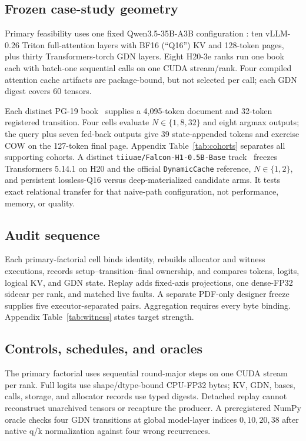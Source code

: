 \documentclass{article}
\begin{document}
\subsection{Frozen case-study geometry}

Primary feasibility uses one fixed Qwen3.5-35B-A3B configuration
\citep{qwen2026qwen35,qwen2026qwen35modelcard}: ten vLLM-0.26 Triton
full-attention layers with BF16 (``Q16'') KV and 128-token pages, plus thirty
Transformers-torch GDN layers.  Eight H20-3e ranks run one book each with
batch-one sequential calls on one CUDA stream/rank.  Four compiled attention
cache artifacts are package-bound, but not selected per call; each GDN digest
covers 60 tensors.

Each distinct PG-19 book~\citep{rae2020compressive} supplies a 4,095-token
document and 32-token registered transition.  Four cells evaluate
$N\in\{1,8,32\}$ and eight argmax outputs; the query plus seven fed-back outputs
give 39 state-appended tokens and exercise COW on the 127-token final page.
Appendix Table~\ref{tab:cohorts} separates all supporting cohorts.  A distinct
\texttt{tiiuae/Falcon-H1-0.5B-Base} track~\citep{zuo2025falconh1} freezes
Transformers 5.14.1 on H20 and the official
\texttt{DynamicCache} reference, $N\in\{1,2\}$, and persistent lossless-Q16
versus deep-materialized candidate arms.  It tests exact relational transfer
for that naive-path configuration, not performance, memory, or quality.

\subsection{Audit sequence}

Each primary-factorial cell binds identity, rebuilds allocator and witness
executions, records setup--transition--final ownership, and compares tokens,
logits, logical KV, and GDN state.  Replay adds fixed-axis projections, one
dense-FP32 sidecar per rank, and matched live faults.  A separate PDF-only
designer freeze supplies five executor-separated pairs.  Aggregation requires
every byte binding.  Appendix Table~\ref{tab:witness} states target strength.

\subsection{Controls, schedules, and oracles}

The primary factorial uses sequential round-major steps on one CUDA stream per
rank.  Full logits use shape/dtype-bound CPU-FP32 bytes; KV, GDN, bases, calls,
storage, and allocator records use typed digests.  Detached replay cannot
reconstruct unarchived tensors or recapture the producer.  A preregistered
NumPy oracle checks four GDN transitions at global model-layer indices
$0,10,20,38$ after native q/k normalization against four wrong recurrences.
\end{document}
